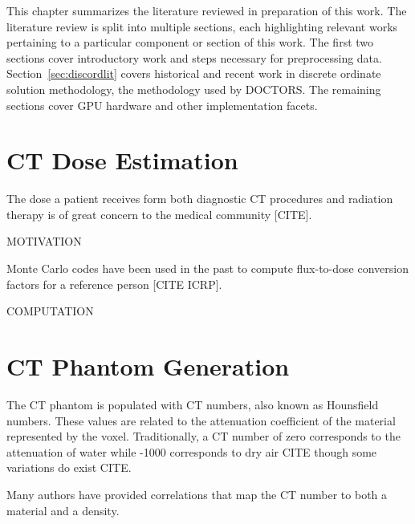 
This chapter summarizes the literature reviewed in preparation of this work. The literature review is split into multiple sections, each highlighting relevant works pertaining to a particular component or section of this work. The first two sections cover introductory work and steps necessary for preprocessing data. Section~\ref{sec:discordlit} covers historical and recent work in discrete ordinate solution methodology, the methodology used by DOCTORS. The remaining sections cover GPU hardware and other implementation facets.

\section{CT Dose Estimation}
The dose a patient receives form both diagnostic CT procedures and radiation therapy is of great concern to the medical community [CITE]. 

MOTIVATION

Monte Carlo codes have been used in the past to compute flux-to-dose conversion factors for a reference person [CITE ICRP].

COMPUTATION

\section{CT Phantom Generation}
The CT phantom is populated with CT numbers, also known as Hounsfield numbers. These values are related to the attenuation coefficient of the material represented by the voxel. Traditionally, a CT number of zero corresponds to the attenuation of water while -1000 corresponds to dry air CITE though some variations do exist CITE.

Many authors have provided correlations that map the CT number to both a material and a density.

